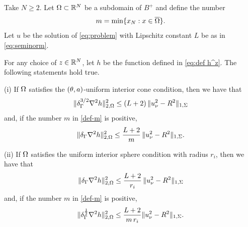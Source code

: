 \documentclass[a4paper,10pt]{amsart}
\numberwithin{equation}{section}
\begin{document}
\begin{lem}
\label{lem:weighted-bounds}
Take $N\ge 2$. Let $\Omega\subset \mathbb{R}^N$ be a subdomain of $B^+ $ and define the number
\begin{equation}
m=\min\{ x_N: x\in\overline{\Omega}\}.
\label{def-m}
\end{equation}
Let $u$ be the solution of \eqref{eq:problem} with Lipschitz constant $L$ be as in \eqref{eq:seminorm}. 
\par
For any choice of $z \in \mathbb{R}^N$, let $h$ be the function defined in \eqref{eq:def h^z}.
The following statements hold true.

(i) If $\Omega$ satisfies the $(\theta, a)$-uniform interior cone condition, then we have that
 \begin{equation*}
 	\Vert \delta_{\Gamma}^{3/2} \nabla^2 h \Vert_{2,\Omega}^2 \le  (L+ 2) \,  \Vert  u_\nu^2 - R^2 \Vert_{1,\Sigma} 
\end{equation*}
and, if the number $m$ in \eqref{def-m} is positive,
\begin{equation*}
	\Vert \delta_{\Gamma} \nabla^2 h \Vert_{2,\Omega}^2 \le  \frac{L+2}{ m }\,  \Vert  u_\nu^2 - R^2 \Vert_{1,\Sigma}.
\end{equation*}


(ii) If $\Omega$ satisfies the uniform interior sphere condition with radius $r_i$, then we have that
\begin{equation*}
	\Vert \delta_{\Gamma} \nabla^2 h \Vert_{2,\Omega}^2 \le \frac{L+2}{r_i}\, \Vert  u_\nu^2 - R^2 \Vert_{1,\Sigma}
\end{equation*}
and, if the number $m$ in \eqref{def-m} is positive,
\begin{equation*}
	\Vert \delta_{\Gamma}^{\frac{1}{2}} \nabla^2 h \Vert_{2,\Omega}^2 \le \frac{L+2}{ m\,r_i} \Vert  u_\nu^2 - R^2 \Vert_{1,\Sigma}.
\end{equation*}






\end{lem}
\end{document}
